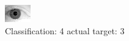 \begin{figure}[h!]
\begin{center}
\includegraphics[width=0.60\columnwidth]{figures/ID2189_class_4_target_3.png}
\end{center}
\caption{ Classification: 4 actual target: 3}
\label{fig:ID2189_class_4_target_3}
\end{figure}
